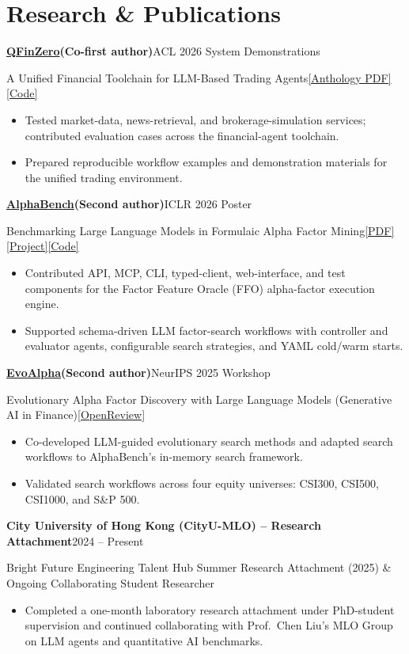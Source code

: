 \documentclass[10pt,a4paper]{article}
\newcommand{\entry}[2]{\needspace{3\baselineskip}\textbf{#1}\hfill{\small\textcolor{accent}{#2}}\par}
\newcommand{\detail}[1]{{\fontsize{9.5}{11.2}\selectfont\textcolor{muted}{#1}\par}}
\newcommand{\gap}{\vspace{3.2pt}}
\begin{document}
\section*{Research \& Publications}
\entry{\href{https://aclanthology.org/2026.acl-demo.7/}{QFinZero}\enspace\textnormal{\small(Co-first author)}}{ACL 2026 System Demonstrations}
\detail{A Unified Financial Toolchain for LLM-Based Trading Agents\enspace\textbar{}\enspace\href{https://aclanthology.org/2026.acl-demo.7.pdf}{[Anthology PDF]}\enspace\href{https://github.com/CityU-MLO/qfinzero}{[Code]}}
\begin{itemize}
  \item Tested market-data, news-retrieval, and brokerage-simulation services; contributed evaluation cases across the financial-agent toolchain.
  \item Prepared reproducible workflow examples and demonstration materials for the unified trading environment.
\end{itemize}
\gap
\entry{\href{https://openreview.net/forum?id=d97Q8r7ZKZ}{AlphaBench}\enspace\textnormal{\small(Second author)}}{ICLR 2026 Poster}
\detail{Benchmarking Large Language Models in Formulaic Alpha Factor Mining\enspace\textbar{}\enspace\href{https://openreview.net/pdf?id=d97Q8r7ZKZ}{[PDF]}\enspace\href{https://alphabench.cc/}{[Project]}\enspace\href{https://github.com/CityU-MLO/AlphaBench}{[Code]}}
\begin{itemize}
  \item Contributed API, MCP, CLI, typed-client, web-interface, and test components for the Factor Feature Oracle (FFO) alpha-factor execution engine.
  \item Supported schema-driven LLM factor-search workflows with controller and evaluator agents, configurable search strategies, and YAML cold/warm starts.
\end{itemize}
\gap
\entry{\href{https://openreview.net/forum?id=ALpLmURYWy}{EvoAlpha}\enspace\textnormal{\small(Second author)}}{NeurIPS 2025 Workshop}
\detail{Evolutionary Alpha Factor Discovery with Large Language Models (Generative AI in Finance)\enspace\textbar{}\enspace\href{https://openreview.net/forum?id=ALpLmURYWy}{[OpenReview]}}
\begin{itemize}
  \item Co-developed LLM-guided evolutionary search methods and adapted search workflows to AlphaBench's in-memory search framework.
  \item Validated search workflows across four equity universes: CSI300, CSI500, CSI1000, and S\&P 500.
\end{itemize}
\gap
\entry{City University of Hong Kong (CityU-MLO) -- Research Attachment}{2024 -- Present}
\detail{Bright Future Engineering Talent Hub Summer Research Attachment (2025) \& Ongoing Collaborating Student Researcher}
\begin{itemize}
  \item Completed a one-month laboratory research attachment under PhD-student supervision and continued collaborating with Prof.\ Chen Liu's MLO Group on LLM agents and quantitative AI benchmarks.
\end{itemize}
\end{document}
